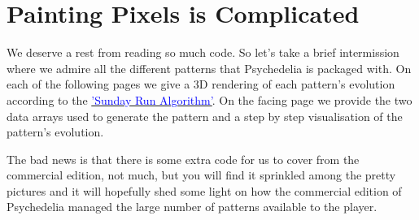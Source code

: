 \chapter{Painting Pixels is Complicated} 
\label{sec:patterns}
\rhead[]{\leftmark}
\lstset{style=6502Style}

We deserve a rest from reading so much code. So let's take a brief intermission where
we admire all the different patterns that Psychedelia is packaged with. On each of the following
pages we give a 3D rendering of each pattern's evolution according to the
\hyperref[sec:listing_pattern]{\textcolor{blue}{'Sunday Run Algorithm'}}.
On the facing page we provide the two data arrays used to generate the pattern and a step by step
visualisation of the pattern's evolution.

The bad news is that there is some extra code for us to cover from the commercial edition, not much,
but you will find it sprinkled among the pretty pictures and it will hopefully shed some light
on how the commercial edition of Psychedelia managed the large number of patterns available to the
player.

